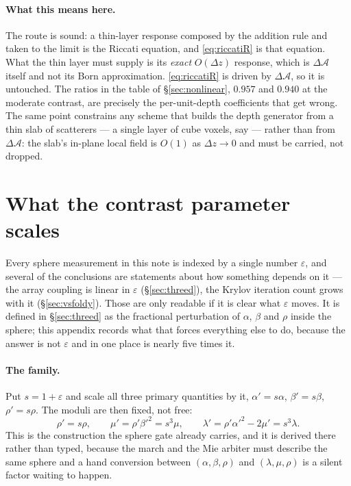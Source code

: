 \documentclass[11pt,a4paper]{article}
\newcommand{\dA}{\Delta\mathcal{A}}
\begin{document}
\paragraph{What this means here.}  The route is sound: a thin-layer response
composed by the addition rule and taken to the limit is the Riccati equation,
and \eqref{eq:riccatiR} is that equation.  What the thin layer must supply is
its \emph{exact} $O(\Delta z)$ response, which is $\dA$ itself and not its Born
approximation.  \eqref{eq:riccatiR} is driven by $\dA$, so it is untouched.  The
ratios in the table of \S\ref{sec:nonlinear}, $0.957$ and $0.940$ at the
moderate contrast, are precisely the per-unit-depth coefficients that
\cite{tromp1989} get wrong.  The same point constrains any scheme that builds the
depth generator from a thin slab of scatterers --- a single layer of cube
voxels, say --- rather than from $\dA$: the slab's in-plane local field is
$O(1)$ as $\Delta z\to0$ and must be carried, not dropped.

\appendix
\section{What the contrast parameter scales}\label{sec:epsscaling}

Every sphere measurement in this note is indexed by a single number
$\varepsilon$, and several of the conclusions are statements about how something
depends on it --- the array coupling is linear in $\varepsilon$
(\S\ref{sec:threed}), the Krylov iteration count grows with it
(\S\ref{sec:vsfoldy}).  Those are only readable if it is clear what
$\varepsilon$ moves.  It is defined in \S\ref{sec:threed} as the fractional
perturbation of $\alpha$, $\beta$ and $\rho$ inside the sphere; this appendix
records what that forces everything else to do, because the answer is not
$\varepsilon$ and in one place is nearly five times it.

\paragraph{The family.}  Put $s = 1+\varepsilon$ and scale all three primary
quantities by it, $\alpha'=s\alpha$, $\beta'=s\beta$, $\rho'=s\rho$.  The moduli
are then fixed, not free:
\begin{equation}\label{eq:sfamily}
  \rho' = s\rho, \qquad
  \mu' = \rho'\beta'^{2} = s^{3}\mu, \qquad
  \lambda' = \rho'\alpha'^{2}-2\mu' = s^{3}\lambda .
\end{equation}
This is the construction the sphere gate already carries, and it is derived
there rather than typed, because the march and the Mie arbiter must describe the
same sphere and a hand conversion between $(\alpha,\beta,\rho)$ and
$(\lambda,\mu,\rho)$ is a silent factor waiting to happen.
\end{document}

